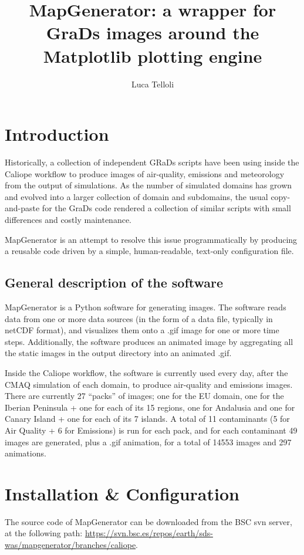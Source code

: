 \documentclass[11pt]{article}
\newcommand{\grads}{GRaDs}
\newcommand{\mg}{MapGenerator}
\begin{document}
\title{\mg{}: a wrapper for GraDs images around the Matplotlib plotting engine}
\author{Luca Telloli}
\date{}
\maketitle

\tableofcontents 
\section{Introduction} 
Historically, a collection of independent \grads{} scripts have been using inside the Caliope workflow to produce images of air-quality, emissions and meteorology from the output of simulations. As the number of simulated domains has grown and evolved into a larger collection of domain and subdomains, the usual copy-and-paste for the GraDs code rendered a collection of similar scripts with small differences and costly maintenance. 

\mg{} is an attempt to resolve this issue programmatically by producing a reusable code driven by a simple, human-readable, text-only configuration file. 

\subsection{General description of the software}
\mg{} is a Python software for generating images. The software reads data from one or more data sources (in the form of a data file, typically in netCDF format), and visualizes them onto a .gif image for one or more time steps. Additionally, the software produces an animated image by aggregating all the static images in the output directory into an animated .gif. 

Inside the Caliope workflow, the software is currently used every day, after the CMAQ simulation of each domain, to produce air-quality and emissions images. There are currently 27 ``packs'' of images; one for the EU domain, one for the Iberian Peninsula + one for each of its 15 regions, one for Andalusia and one for Canary Island + one for each of its 7 islands. A total of 11 contaminants (5 for Air Quality + 6 for Emissions) is run for each pack, and for each contaminant 49 images are generated, plus a .gif animation, for a total of 14553 images and 297 animations. 

\section{Installation \& Configuration}
The source code of \mg{} can be downloaded from the BSC svn server, at the following path: 
\url{https://svn.bsc.es/repos/earth/sds-was/mapgenerator/branches/caliope}. 
\end{document}
